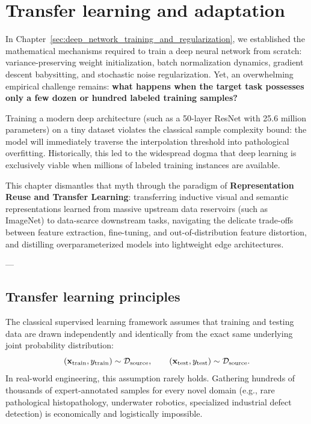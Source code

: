 \chapter{Transfer learning and adaptation}
\label{sec:transfer_learning_distillation}

In Chapter~\ref{sec:deep_network_training_and_regularization}, we established the mathematical mechanisms required to train a deep neural network from scratch: variance-preserving weight initialization, batch normalization dynamics, gradient descent babysitting, and stochastic noise regularization. Yet, an overwhelming empirical challenge remains: \textbf{what happens when the target task possesses only a few dozen or hundred labeled training samples?}

Training a modern deep architecture (such as a 50-layer ResNet with 25.6 million parameters) on a tiny dataset violates the classical sample complexity bound: the model will immediately traverse the interpolation threshold into pathological overfitting. Historically, this led to the widespread dogma that deep learning is exclusively viable when millions of labeled training instances are available.

This chapter dismantles that myth through the paradigm of \textbf{Representation Reuse and Transfer Learning}: transferring inductive visual and semantic representations learned from massive upstream data reservoirs (such as ImageNet) to data-scarce downstream tasks, navigating the delicate trade-offs between feature extraction, fine-tuning, and out-of-distribution feature distortion, and distilling overparameterized models into lightweight edge architectures.

---

\section{Transfer learning principles}
\label{sec:transfer_learning_paradigm}

The classical supervised learning framework assumes that training and testing data are drawn independently and identically from the exact same underlying joint probability distribution:
\begin{equation}
(\mathbf{x}_{\text{train}}, y_{\text{train}}) \sim \mathcal{D}_{\text{source}}, \qquad (\mathbf{x}_{\text{test}}, y_{\text{test}}) \sim \mathcal{D}_{\text{source}}.
\end{equation}
In real-world engineering, this assumption rarely holds. Gathering hundreds of thousands of expert-annotated samples for every novel domain (e.g., rare pathological histopathology, underwater robotics, specialized industrial defect detection) is economically and logistically impossible.

